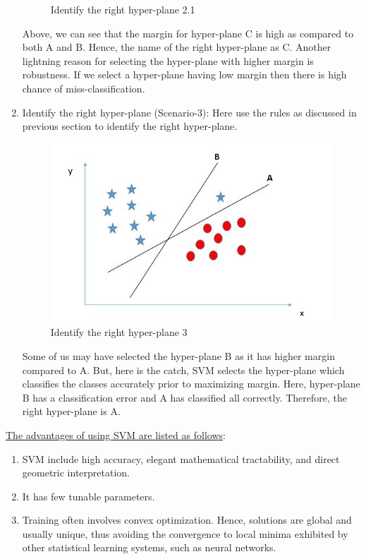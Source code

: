 \begin{enumerate}
\begin{figure}[h!]
                \caption[Identify the right hyper-plane 2.1]{Identify the right hyper-plane 2.1}
                \label{fig:my_label}
            \end{figure}
        Above, we can see that the margin for hyper-plane C is high as compared to both A and B. Hence, the name of the right hyper-plane as C. Another lightning reason for selecting the hyper-plane with higher margin is robustness. If we select a hyper-plane having low margin then there is high chance of miss-classification.
        \item Identify the right hyper-plane (Scenario-3): Here use the rules as discussed in previous section to identify the right hyper-plane.
            \begin{figure}[h!]
                \centering
                \includegraphics[scale=0.5]{Figures/svm15.png}
                \caption[Identify the right hyper-plane 3]{Identify the right hyper-plane 3}
                \label{fig:my_label}
            \end{figure}
        Some of us may have selected the hyper-plane B as it has higher margin compared to A. But, here is the catch, SVM selects the hyper-plane which classifies the classes accurately prior to maximizing margin. Here, hyper-plane B has a classification error and A has classified all correctly. Therefore, the right hyper-plane is A.
        
    \end{enumerate}

   
   \underline{The advantages of using SVM are listed as follows}:
   
   \begin{enumerate}
       \item SVM include high accuracy, elegant mathematical tractability, and direct geometric interpretation.
       \item It has few tunable parameters.
       \item Training often involves convex optimization. Hence, solutions are global and usually unique, thus avoiding the convergence to local minima exhibited by other statistical learning systems, such as neural networks.
   \end{enumerate}
   
